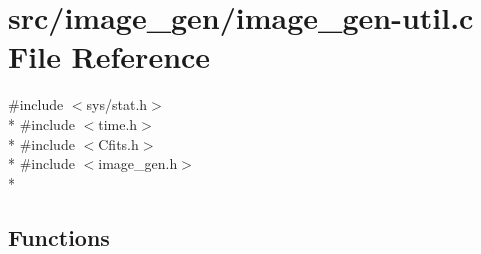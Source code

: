 \hypertarget{src_2image__gen_2image__gen-util_8c}{\section{src/image\+\_\+gen/image\+\_\+gen-\/util.c File Reference}
\label{src_2image__gen_2image__gen-util_8c}
}
{\ttfamily \#include $<$sys/stat.\+h$>$}\\*
{\ttfamily \#include $<$time.\+h$>$}\\*
{\ttfamily \#include $<$Cfits.\+h$>$}\\*
{\ttfamily \#include $<$image\+\_\+gen.\+h$>$}\\*
\subsection*{Functions}
